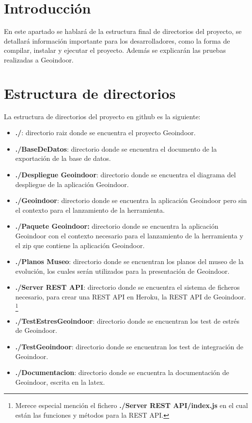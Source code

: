 
\section{Introducción}

En este apartado se hablará de la estructura final de directorios del proyecto, se detallará información importante para los desarrolladores, como la forma de compilar, instalar y ejecutar el proyecto. Además se explicarán las pruebas realizadas a Geoindoor.

\section{Estructura de directorios}

La estructura de directorios del proyecto en github es la siguiente:

\begin{itemize}
	\item \textbf{./}: directorio raiz donde se encuentra el proyecto Geoindoor.
	\item \textbf{./BaseDeDatos}: directorio donde se encuentra el documento de la exportación de la base de datos.
	\item \textbf{./Despliegue Geoindoor}: directorio donde se encuentra el diagrama del despliegue de la aplicación Geoindoor.
	\item \textbf{./Geoindoor}: directorio donde se encuentra la aplicación Geoindoor pero sin el contexto para el lanzamiento de la herramienta.
	\item  \textbf{./Paquete Geoindoor:} directorio donde se encuentra la aplicación Geoindoor con el contexto necesario para el lanzamiento de la herramienta y el zip que contiene la aplicación Geoindoor.
	\item \textbf{./Planos Museo}: directorio donde se encuentran los planos del museo de la evolución, los cuales serán utilizados para la presentación de Geoindoor.
	\item \textbf{./Server REST API}: directorio donde se encuentra el sistema de ficheros necesario, para crear una REST API en Heroku, la REST API de Geoindoor.
	\footnote{Merece especial mención el fichero \textbf{./Server REST API/index.js} en el cual están las funciones y métodos para la REST API.}
	\item \textbf{./TestEstresGeoindoor}: directorio donde se encuentran los test de estrés de Geoindoor.
	\item \textbf{./TestGeoindoor}: directorio donde se encuentran los test de integración de Geoindoor.
	\item \textbf{./Documentacion}: directorio donde se encuentra la documentación de Geoindoor, escrita en la latex.
\end{itemize}


